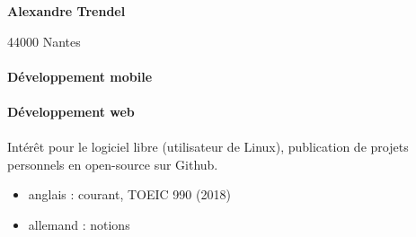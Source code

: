 \documentclass{cv}
\begin{document}
\hfill
\begin{minipage}[t]{0.28\textwidth}%

	\begin{center}

	\textbf{\large Alexandre Trendel}
	\end{center}

	44000 Nantes
	\newline{}%
	\newline{} \href{mailto:%
	}{\link{%
	}}%
	\newline{} \href{https://github.com/xou816}{} 
	
\end{minipage}


\paragraph{Développement mobile} 
   

\paragraph{Développement web}
      

\paragraph{} Intérêt pour le logiciel libre (utilisateur de Linux), publication de projets personnels en open-source sur Github.



\begin{itemize}
\item anglais : courant, TOEIC 990 (2018)
\item allemand : notions
\end{itemize}



\end{document}
